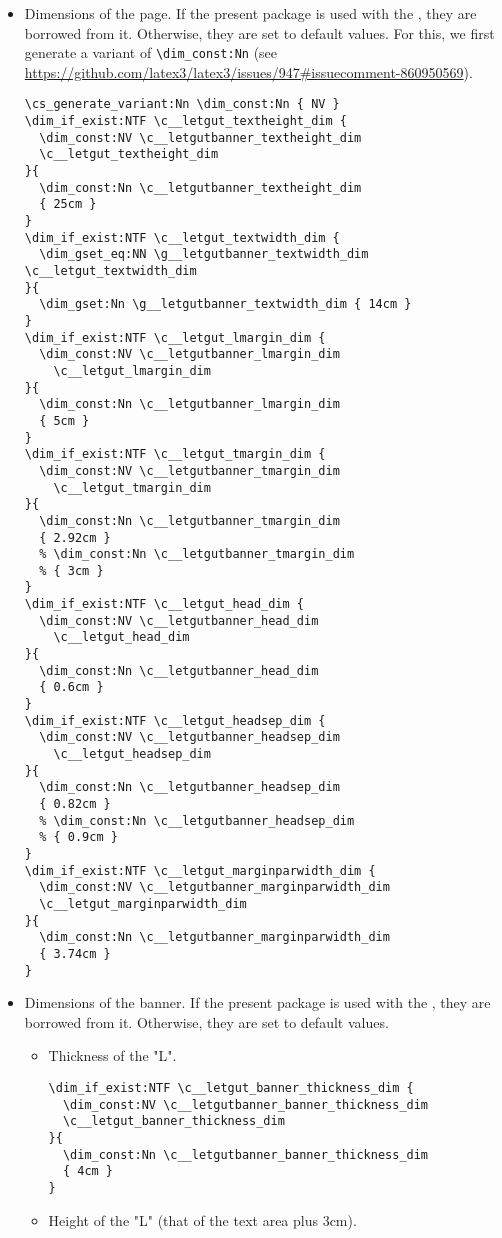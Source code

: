 \documentclass{letgut}
\begin{document}
\begin{itemize}
\item Dimensions of the page. If the present package is used with the
, they are borrowed from it. Otherwise, they are set to default
values. For this, we first generate a variant of \lstinline+\dim_const:Nn+ (see
\url{https://github.com/latex3/latex3/issues/947\#issuecomment-860950569}).
\begin{lstlisting}
\cs_generate_variant:Nn \dim_const:Nn { NV }
\dim_if_exist:NTF \c__letgut_textheight_dim {
  \dim_const:NV \c__letgutbanner_textheight_dim
  \c__letgut_textheight_dim
}{
  \dim_const:Nn \c__letgutbanner_textheight_dim
  { 25cm }
}
\dim_if_exist:NTF \c__letgut_textwidth_dim {
  \dim_gset_eq:NN \g__letgutbanner_textwidth_dim \c__letgut_textwidth_dim
}{
  \dim_gset:Nn \g__letgutbanner_textwidth_dim { 14cm }
}
\dim_if_exist:NTF \c__letgut_lmargin_dim {
  \dim_const:NV \c__letgutbanner_lmargin_dim
    \c__letgut_lmargin_dim
}{
  \dim_const:Nn \c__letgutbanner_lmargin_dim
  { 5cm }
}
\dim_if_exist:NTF \c__letgut_tmargin_dim {
  \dim_const:NV \c__letgutbanner_tmargin_dim
    \c__letgut_tmargin_dim
}{
  \dim_const:Nn \c__letgutbanner_tmargin_dim
  { 2.92cm }
  % \dim_const:Nn \c__letgutbanner_tmargin_dim
  % { 3cm }
}
\dim_if_exist:NTF \c__letgut_head_dim {
  \dim_const:NV \c__letgutbanner_head_dim
    \c__letgut_head_dim
}{
  \dim_const:Nn \c__letgutbanner_head_dim
  { 0.6cm }
}
\dim_if_exist:NTF \c__letgut_headsep_dim {
  \dim_const:NV \c__letgutbanner_headsep_dim
    \c__letgut_headsep_dim
}{
  \dim_const:Nn \c__letgutbanner_headsep_dim
  { 0.82cm }
  % \dim_const:Nn \c__letgutbanner_headsep_dim
  % { 0.9cm }
}
\dim_if_exist:NTF \c__letgut_marginparwidth_dim {
  \dim_const:NV \c__letgutbanner_marginparwidth_dim
  \c__letgut_marginparwidth_dim
}{
  \dim_const:Nn \c__letgutbanner_marginparwidth_dim
  { 3.74cm }
}
\end{lstlisting}
\item Dimensions of the banner. If the present package is used with the
, they are borrowed from it. Otherwise, they are set to
default values.
\begin{itemize}
\item Thickness of the "L".
\begin{lstlisting}
\dim_if_exist:NTF \c__letgut_banner_thickness_dim {
  \dim_const:NV \c__letgutbanner_banner_thickness_dim
  \c__letgut_banner_thickness_dim
}{
  \dim_const:Nn \c__letgutbanner_banner_thickness_dim
  { 4cm }
}
\end{lstlisting}
\item Height of the "L" (that of the text area plus 3cm).

\end{itemize}
\end{itemize}
\end{document}

